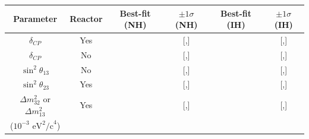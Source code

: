 \documentclass[11pt]{elsarticle}
\newcommand{\ssqthonethree}{$\sin^2\theta_{13}$\xspace}
\newcommand{\ssqthtwothree}{$\sin^2\theta_{23}$\xspace}
\newcommand{\deltacp}{$\delta_{CP}$\xspace}
\newcommand{\dmsqtwothree}{$\Delta m^2_{32}$\xspace}
\newcommand{\dmsqonethree}{$\Delta m^2_{13}$\xspace}
\begin{document}


\begin{table}[H]
	\centering
	\begin{tabular}{| c | c | c | c | c | c |}
		\hline
		Parameter & Reactor & Best-fit (NH) & $\pm1\sigma$ (NH) & Best-fit (IH) & $\pm1\sigma$ (IH) \\
		\hline
		\deltacp & Yes & \BestFitDeltacpwRC & [\MOneSigmaDeltacpwRC,\POneSigmaDeltacpwRC] & \BestFitDeltacpwRCIH & [\MOneSigmaDeltacpwRCIH,\POneSigmaDeltacpwRCIH] \\
		\deltacp & No & \BestFitDeltacpwoRC & [\MOneSigmaDeltacpwoRC,\POneSigmaDeltacpwoRC] & \BestFitDeltacpwoRCIH & [\MOneSigmaDeltacpwoRCIH,\POneSigmaDeltacpwoRCIH] \\
		\ssqthonethree & No & \BestFitMixingOneThreewoRC & [\MOneMixingOneThreewoRC,\POneMixingOneThreewoRC] & \BestFitMixingOneThreewoRCIH & [\MOneMixingOneThreewoRCIH,\POneMixingOneThreewoRCIH] \\
		\ssqthtwothree & Yes & \BestFitMixingTwoThreewRC & [\MOneMixingTwoThreewRC,\POneMixingTwoThreewRC] & \BestFitMixingTwoThreewRCIH & [\MOneMixingTwoThreewRCIH,\POneMixingTwoThreewRCIH] \\
		\dmsqtwothree or \dmsqonethree & Yes & \BestFitDmTwoThreewRC & [\MOneDmTwoThreewRC,\POneDmTwoThreewRC] & \BestFitDmTwoThreewRCIH & [\MOneDmTwoThreewRCIH,\POneDmTwoThreewRCIH] \\
		($10^{-3}\text{ eV}^2\text{/c}^4$) & & & & & \\
		\hline
	\end{tabular}
\end{table}
\end{document}
